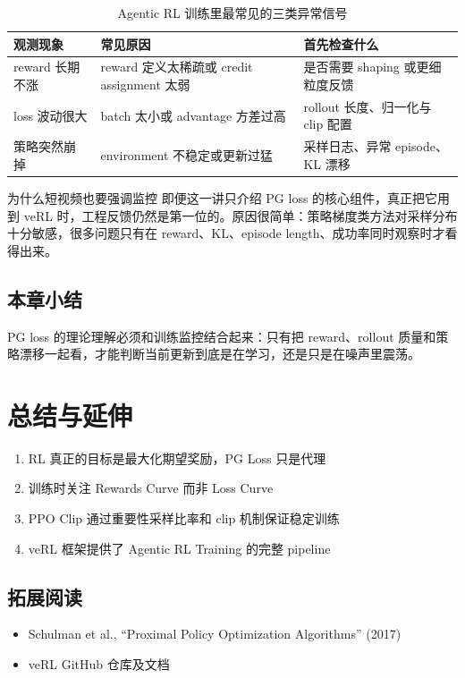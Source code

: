 \documentclass[a4paper]{article}
\begin{document}
\begin{table}[H]
\centering
\begin{tabular}{p{3.5cm}p{5cm}p{4.5cm}}
\toprule
观测现象 & 常见原因 & 首先检查什么 \\
\midrule
reward 长期不涨 & reward 定义太稀疏或 credit assignment 太弱 & 是否需要 shaping 或更细粒度反馈 \\
loss 波动很大 & batch 太小或 advantage 方差过高 & rollout 长度、归一化与 clip 配置 \\
策略突然崩掉 & environment 不稳定或更新过猛 & 采样日志、异常 episode、KL 漂移 \\
\bottomrule
\end{tabular}
\caption{Agentic RL 训练里最常见的三类异常信号}
\end{table}

\begin{knowledgebox}{为什么短视频也要强调监控}
即便这一讲只介绍 PG loss 的核心组件，真正把它用到 veRL 时，工程反馈仍然是第一位的。原因很简单：策略梯度类方法对采样分布十分敏感，很多问题只有在 reward、KL、episode length、成功率同时观察时才看得出来。
\end{knowledgebox}

\subsection{本章小结}
PG loss 的理论理解必须和训练监控结合起来：只有把 reward、rollout 质量和策略漂移一起看，才能判断当前更新到底是在学习，还是只是在噪声里震荡。

\newpage
\section{总结与延伸}
\begin{enumerate}
  \item RL 真正的目标是最大化期望奖励，PG Loss 只是代理
  \item 训练时关注 Rewards Curve 而非 Loss Curve
  \item PPO Clip 通过重要性采样比率和 clip 机制保证稳定训练
  \item veRL 框架提供了 Agentic RL Training 的完整 pipeline
\end{enumerate}

\subsection{拓展阅读}
\begin{itemize}
  \item Schulman et al., ``Proximal Policy Optimization Algorithms'' (2017)
  \item veRL GitHub 仓库及文档
\end{itemize}
\end{document}
